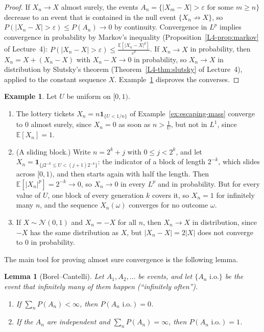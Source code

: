 \documentclass[11pt]{article}
\newcommand{\E}{\mathbb{E}}
\theoremstyle{definition}
\newtheorem{example}[definition]{Example}
\theoremstyle{plain}
\newtheorem{lemma}[definition]{Lemma}
\theoremstyle{remark}
\begin{document}
\begin{proof}
    If $X_n \to X$ almost surely, the events $A_n = \{|X_m - X| > \varepsilon \text{ for some } m \geq n\}$ decrease to an event that is contained in the null event $\{X_n \not\to X\}$, so $P(|X_n - X| > \varepsilon) \leq P(A_n) \to 0$ by continuity. Convergence in $L^p$ implies convergence in probability by Markov's inequality (Proposition~\ref{L4-prop:markov} of Lecture~4): $P(|X_n - X| > \varepsilon) \leq \frac{\E[|X_n - X|^p]}{\varepsilon^p}$. If $X_n \to X$ in probability, then $X_n = X + (X_n - X)$ with $X_n - X \to 0$ in probability, so $X_n \to X$ in distribution by Slutsky's theorem (Theorem~\ref{L4-thm:slutsky} of Lecture~4), applied to the constant sequence $X$. Example~\ref{ex:convergence-counterexamples} disproves the converses.
\end{proof}

\begin{example}\label{ex:convergence-counterexamples}
    Let $U$ be uniform on $[0, 1)$.
    \begin{enumerate}
        \item The lottery tickets $X_n = n\mathbf{1}_{\{U < 1/n\}}$ of Example~\ref{ex:escaping-mass} converge to $0$ almost surely, since $X_n = 0$ as soon as $n > \frac{1}{U}$, but not in $L^1$, since $\E[X_n] = 1$.
        \item (A sliding block.) Write $n = 2^k + j$ with $0 \leq j < 2^k$, and let $X_n = \mathbf{1}_{\{j2^{-k} \leq U < (j + 1)2^{-k}\}}$: the indicator of a block of length $2^{-k}$, which slides across $[0, 1)$, and then starts again with half the length. Then $\E[|X_n|^p] = 2^{-k} \to 0$, so $X_n \to 0$ in every $L^p$ and in probability. But for every value of $U$, one block of every generation $k$ covers it, so $X_n = 1$ for infinitely many $n$, and the sequence $X_n(\omega)$ converges for no outcome $\omega$.
        \item If $X \sim \mathcal{N}(0, 1)$ and $X_n = -X$ for all $n$, then $X_n \to X$ in distribution, since $-X$ has the same distribution as $X$, but $|X_n - X| = 2|X|$ does not converge to $0$ in probability.
    \end{enumerate}
\end{example}

The main tool for proving almost sure convergence is the following lemma.

\begin{lemma}[Borel--Cantelli]\label{lem:borel-cantelli}
    Let $A_1, A_2, \ldots$ be events, and let $\{A_n \text{ i.o.}\}$ be the event that infinitely many of them happen (``infinitely often'').
    \begin{enumerate}
        \item If $\sum_n P(A_n) < \infty$, then $P(A_n \text{ i.o.}) = 0$.
        \item If the $A_n$ are independent and $\sum_n P(A_n) = \infty$, then $P(A_n \text{ i.o.}) = 1$.
    \end{enumerate}
\end{lemma}
\end{document}
